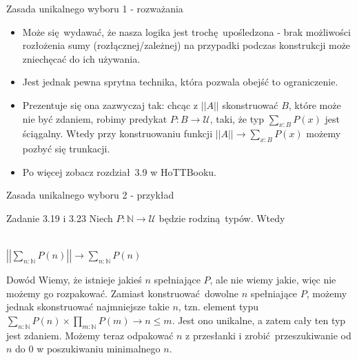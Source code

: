\documentclass{beamer}
\newcommand{\U}{\mathcal{U}}
\newcommand{\trf}[1]{||#1||}
\begin{document}
\begin{frame}{Zasada unikalnego wyboru 1 - rozważania}
\begin{itemize}
	\item Może się wydawać, że nasza logika jest trochę upośledzona - brak możliwości rozłożenia sumy (rozłącznej/zależnej) na przypadki podczas konstrukcji może zniechęcać do ich używania.
	\item Jest jednak pewna sprytna technika, która pozwala obejść to ograniczenie.
	\item Prezentuje się ona zazwyczaj tak: chcąc z $\trf{A}$ skonstruować $B$, które może nie być zdaniem, robimy predykat $P : B \to \U$, taki, że typ $\sum_{x : B} P(x)$ jest ściągalny. Wtedy przy konstruowaniu funkcji $\trf{A} \to \sum_{x : B} P(x)$ możemy pozbyć się trunkacji.
	\item Po więcej zobacz rozdział 3.9 w HoTTBooku.
\end{itemize}
\end{frame}

\begin{frame}{Zasada unikalnego wyboru 2 - przykład}
	
\begin{block}{Zadanie 3.19 i 3.23}
Niech $P : \mathbb{N} \to \U$ będzie rodziną typów. Wtedy \\~\

\begin{center}
$\displaystyle \left|\left|\sum_{n : \mathbb{N}} P(n)\right|\right| \to \sum_{n : \mathbb{N}} P(n)$
\end{center}
\end{block}

\begin{block}{Dowód}
Wiemy, że istnieje jakieś $n$ spełniające $P$, ale nie wiemy jakie, więc nie możemy go rozpakować. Zamiast konstruować dowolne $n$ spełniające $P$, możemy jednak skonstruować najmniejsze takie $n$, tzn. element typu $\sum_{n : \mathbb{N}} P(n) \times \prod_{m : \mathbb{N}} P(m) \to n \leq m$. Jest ono unikalne, a zatem cały ten typ jest zdaniem. Możemy teraz odpakować $n$ z przesłanki i zrobić przeszukiwanie od $n$ do $0$ w poszukiwaniu minimalnego $n$.
\end{block}

\end{frame}
\end{document}
